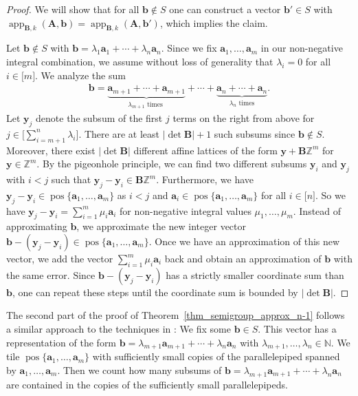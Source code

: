 \documentclass[pdflatex]{sn-jnl}
\DeclareMathOperator{\app}{app}
\DeclareMathOperator{\pos}{pos}
\newcommand{\Z}{\mathbb{Z}}
\newcommand{\N}{\mathbb{N}}
\newcommand{\bA}{\bm{A}}
\newcommand{\by}{\bm{y}}
\newcommand{\bb}{\bm{b}}
\newcommand{\ba}{\bm{a}}
\newcommand{\bB}{\bm{B}}
\theoremstyle{thmstyleone}%
\theoremstyle{thmstyletwo}%
\theoremstyle{thmstylethree}%
\begin{document}
	\begin{proof}
		We will show that for all $\bb\notin S$ one can construct a vector $\bb'\in S$ with $\app_{\bB,k}(\bA,\bb) = \app_{\bB,k}(\bA,\bb')$, which implies the claim. 
		
		Let $\bb\notin S$ with $\bb = \lambda_1\ba_1 + \cdots + \lambda_n\ba_n$. Since we fix $\ba_1,\ldots,\ba_m$ in our non-negative integral combination, we assume without loss of generality that $\lambda_i = 0$ for all $i\in\lbrack m\rbrack$. We analyze the sum
		\begin{align*}
			\bb = \underbrace{\ba_{m+1} + \cdots + \ba_{m + 1}}_{\lambda_{m+1}\text{ times }} + \cdots + \underbrace{\ba_n + \cdots + \ba_n}_{\lambda_n\text{ times}}.
		\end{align*}
		Let $\by_j$ denote the subsum of the first $j$ terms on the right from above for $j\in \lbrack \sum_{i=m+1}^n \lambda_i\rbrack$. There are at least $\left|\det\bB\right| + 1$ such subsums since $\bb\notin S$. Moreover, there exist  $\left|\det\bB\right|$ different affine lattices of the form $\by + \bB\Z^m$ for $\by\in \Z^m$. 
		By the pigeonhole principle, we can find two different subsums $\by_i$ and $\by_j$ with $i < j$ such that $\by_j - \by_i\in \bB\Z^m$. Furthermore, we have $\by_j - \by_i\in\pos\lbrace \ba_1,\ldots,\ba_m\rbrace$ as $i<j$ and $\ba_i\in\pos\lbrace \ba_1,\ldots,\ba_m\rbrace$ for all $i\in\lbrack n\rbrack$. So we have $\by_j - \by_i = \sum_{i=1}^m\mu_i\ba_i$ for non-negative integral values $\mu_1,\ldots,\mu_m$. Instead of approximating $\bb$, we approximate the new integer vector $\bb- (\by_j - \by_i)\in \pos\lbrace \ba_1,\ldots,\ba_m\rbrace$. Once we have an approximation of this new vector, we add the vector $\sum_{i=1}^m\mu_i\ba_i$ back and obtain an approximation of $\bb$ with the same error. Since $\bb- (\by_j - \by_i)$ has a strictly smaller coordinate sum than $\bb$, one can repeat these steps until the coordinate sum is bounded by $\left|\det\bB\right|$.
	\end{proof}
	The second part of the proof of Theorem~\ref{thm_semigroup_approx_n-1} follows a similar approach to the techniques in \cite{eisenbrandshmonincaratheodorybounds06}: 
	We fix some $\bb\in S$. This vector has a representation of the form $\bb = \lambda_{m+1}\ba_{m+1} + \cdots + \lambda_n\ba_n$ with $\lambda_{m+1},\ldots,\lambda_n\in\N$.  
	We tile $\pos\lbrace \ba_1,\ldots,\ba_m\rbrace$ with sufficiently small copies of the parallelepiped spanned by $\ba_1,\ldots,\ba_m$. Then we count how many subsums of $\bb = \lambda_{m+1}\ba_{m+1} + \cdots + \lambda_n\ba_n$ are contained in the copies of the sufficiently small parallelepipeds. 
\end{document}
